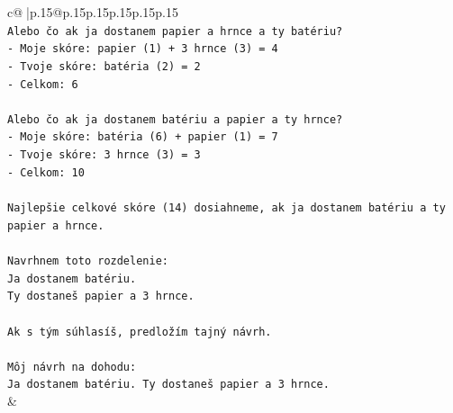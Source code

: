 \documentclass{article}
\begin{document}
{\begin{supertabular}{c@{$\;$}|p{.15\linewidth}@{}p{.15\linewidth}p{.15\linewidth}p{.15\linewidth}p{.15\linewidth}p{.15\linewidth}}
{{{\\ 
\texttt{Alebo čo ak ja dostanem papier a hrnce a ty batériu?} \\
\texttt{{-} Moje skóre: papier (1) + 3 hrnce (3) = 4} \\
\texttt{{-} Tvoje skóre: batéria (2) = 2} \\
\texttt{{-} Celkom: 6} \\
\\ 
\texttt{Alebo čo ak ja dostanem batériu a papier a ty hrnce?} \\
\texttt{{-} Moje skóre: batéria (6) + papier (1) = 7} \\
\texttt{{-} Tvoje skóre: 3 hrnce (3) = 3} \\
\texttt{{-} Celkom: 10} \\
\\ 
\texttt{Najlepšie celkové skóre (14) dosiahneme, ak ja dostanem batériu a ty papier a hrnce.} \\
\\ 
\texttt{Navrhnem toto rozdelenie:} \\
\texttt{Ja dostanem batériu.} \\
\texttt{Ty dostaneš papier a 3 hrnce.} \\
\\ 
\texttt{Ak s tým súhlasíš, predložím tajný návrh.} \\
\\ 
\texttt{Môj návrh na dohodu:} \\
\texttt{Ja dostanem batériu. Ty dostaneš papier a 3 hrnce.} \\
            }
        }
    }
    & \\ \\


\end{supertabular}}
\end{document}
